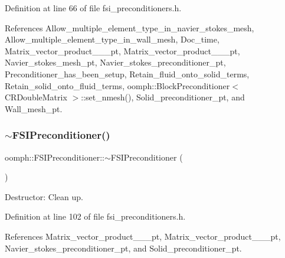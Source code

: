 Definition at line 66 of file fsi\+\_\+preconditioners.\+h.



References Allow\+\_\+multiple\+\_\+element\+\_\+type\+\_\+in\+\_\+navier\+\_\+stokes\+\_\+mesh, Allow\+\_\+multiple\+\_\+element\+\_\+type\+\_\+in\+\_\+wall\+\_\+mesh, Doc\+\_\+time, Matrix\+\_\+vector\+\_\+product\+\_\+\_\+\_\+pt, Matrix\+\_\+vector\+\_\+product\+\_\+\_\+\_\+pt, Navier\+\_\+stokes\+\_\+mesh\+\_\+pt, Navier\+\_\+stokes\+\_\+preconditioner\+\_\+pt, Preconditioner\+\_\+has\+\_\+been\+\_\+setup, Retain\+\_\+fluid\+\_\+onto\+\_\+solid\+\_\+terms, Retain\+\_\+solid\+\_\+onto\+\_\+fluid\+\_\+terms, oomph\+::\+Block\+Preconditioner$<$ C\+R\+Double\+Matrix $>$\+::set\+\_\+nmesh(), Solid\+\_\+preconditioner\+\_\+pt, and Wall\+\_\+mesh\+\_\+pt.

\mbox{\label{classoomph_1_1FSIPreconditioner_a787995de6ec09a9113b1b9a8b7c4f9cc}} 
\subsubsection{\texorpdfstring{$\sim$\+F\+S\+I\+Preconditioner()}{~FSIPreconditioner()}}
{\footnotesize\ttfamily oomph\+::\+F\+S\+I\+Preconditioner\+::$\sim$\+F\+S\+I\+Preconditioner (\begin{DoxyParamCaption}{ }\end{DoxyParamCaption})\hspace{0.3cm}{\ttfamily [inline]}}



Destructor\+: Clean up. 



Definition at line 102 of file fsi\+\_\+preconditioners.\+h.



References Matrix\+\_\+vector\+\_\+product\+\_\+\_\+\_\+pt, Matrix\+\_\+vector\+\_\+product\+\_\+\_\+\_\+pt, Navier\+\_\+stokes\+\_\+preconditioner\+\_\+pt, and Solid\+\_\+preconditioner\+\_\+pt.

\mbox{\label{classoomph_1_1FSIPreconditioner_a499de26b5f215957727155cf5f950019}} 
